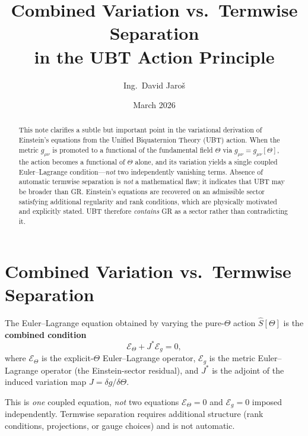 \documentclass[12pt]{article}
\title{\textbf{Combined Variation vs.\ Termwise Separation\\
         in the UBT Action Principle}}
\author{Ing.\ David Jaroš}
\date{March 2026}
\theoremstyle{definition}
\theoremstyle{remark}
\begin{document}
  \maketitle

  \begin{abstract}
  This note clarifies a subtle but important point in the variational derivation
  of Einstein's equations from the Unified Biquaternion Theory (UBT) action.
  When the metric $g_{\mu\nu}$ is promoted to a functional of the fundamental
  field $\Theta$ via $g_{\mu\nu} = g_{\mu\nu}[\Theta]$, the action becomes a
  functional of $\Theta$ alone, and its variation yields a single coupled
  Euler--Lagrange condition—\emph{not} two independently vanishing terms.
  Absence of automatic termwise separation is \emph{not} a mathematical flaw;
  it indicates that UBT may be broader than GR.  Einstein's equations are
  recovered on an admissible sector satisfying additional regularity and
  rank conditions, which are physically motivated and explicitly stated.
  UBT therefore \emph{contains} GR as a sector rather than contradicting it.
  \end{abstract}
\fi

\section{Combined Variation vs.\ Termwise Separation}
\label{sec:combined_vs_termwise}

\begin{tcolorbox}[colback=blue!5!white,colframe=blue!75!black,
                  title=Central Message of This Note]
The Euler--Lagrange equation obtained by varying the pure-$\Theta$ action
$\hat{S}[\Theta]$ is the \textbf{combined condition}
\begin{equation}
  \mathcal{E}_\Theta + J^{*}\mathcal{E}_g = 0,
  \tag{$\star$}
\end{equation}
where $\mathcal{E}_\Theta$ is the explicit-$\Theta$ Euler--Lagrange operator,
$\mathcal{E}_g$ is the metric Euler--Lagrange operator (the Einstein-sector
residual), and $J^{*}$ is the adjoint of the induced variation map
$J = \delta g / \delta\Theta$.

This is \emph{one} coupled equation, \emph{not} two equations $\mathcal{E}_\Theta = 0$
and $\mathcal{E}_g = 0$ imposed independently.  Termwise separation requires
additional structure (rank conditions, projections, or gauge choices) and is
not automatic.
\end{tcolorbox}
\end{document}
